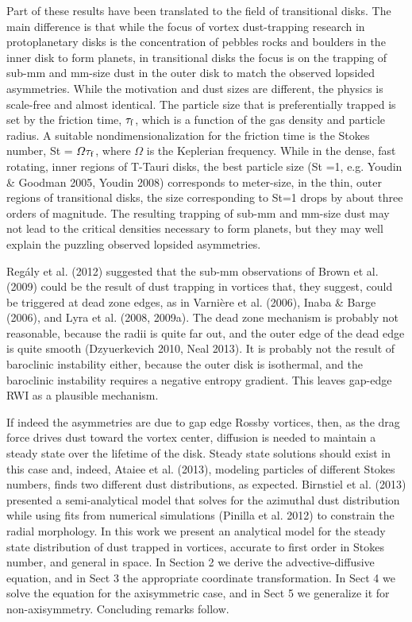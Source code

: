 \documentclass[apj]{emulateapj}
\begin{document}
Part of these results have been translated to the field of
transitional disks. The main difference is that while the focus 
of vortex dust-trapping research in protoplanetary disks is the
concentration of pebbles rocks and boulders in the inner disk to form
planets, in transitional disks the focus is on the trapping of sub-mm
and mm-size dust in the outer disk to match the observed lopsided 
asymmetries. While the motivation and dust sizes are different, the
physics is scale-free and almost identical. The particle size that is
preferentially trapped is set by the friction time, $\tau_{\rm f}$, which is a
function of the gas density and particle radius. A suitable nondimensionalization for the
friction time is the Stokes number, St = $\varOmega \tau_{\rm f}$,
where $\varOmega$ is the Keplerian frequency. While in the dense, fast
rotating, inner regions of T-Tauri disks, the best particle size (St =1, e.g. 
Youdin \& Goodman 2005, Youdin 2008)
corresponds to meter-size, in the thin, outer regions of transitional
disks, the size corresponding to St=1 drops by about three orders of
magnitude. The resulting trapping of sub-mm and mm-size dust may not
lead to the critical densities necessary to form planets, but they may
well explain the puzzling observed lopsided asymmetries. 

Reg\'aly et al. (2012) suggested that the sub-mm 
observations of Brown et al. (2009) could be the result of dust
trapping in vortices that, they suggest, could be triggered at dead
zone edges, as in Varni\`ere et al. (2006), Inaba \& Barge (2006), and Lyra et
al. (2008, 2009a). The dead zone mechanism is probably not reasonable,
because the radii is quite far out, and the outer edge of the dead
edge is quite smooth (Dzyuerkevich 2010, Neal 2013). It is probably
not the result of baroclinic instability either, because the outer
disk is isothermal, and the baroclinic instability requires a negative
entropy gradient. This leaves gap-edge RWI as a plausible mechanism. 

If indeed the asymmetries are due to gap edge Rossby vortices, then, 
as the drag force drives dust toward the vortex center, diffusion is
needed to maintain a steady state over the lifetime of the disk. 
Steady state solutions should exist in this case and, indeed, Ataiee
et al. (2013), modeling particles of different Stokes numbers, finds
two different dust distributions, as expected. Birnstiel et al. (2013) 
presented a semi-analytical model that solves for the azimuthal dust 
distribution while using fits from numerical simulations (Pinilla et al. 2012)
to constrain the radial morphology. In this work we present an analytical 
model for the steady state distribution of dust trapped in vortices, 
accurate to first order in Stokes number, and general in space. In 
Section 2 we derive the
advective-diffusive equation, and in Sect 3 the appropriate coordinate
transformation. In Sect 4 we solve the equation for the axisymmetric
case, and in Sect 5 we generalize it for non-axisymmetry. Concluding
remarks follow. 
\end{document}
